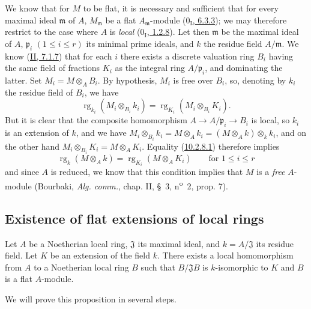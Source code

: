 We know that for $M$ to be flat, it is necessary and sufficient that for every
maximal ideal $\mathfrak m$ of $A$, $M_{\mathfrak m}$ be a flat
$A_{\mathfrak m}$-module
(\hyperref[0.6.3.3]{$0_{\mathrm I}$, 6.3.3}); we may therefore restrict to the case
where $A$ is \emph{local} (\hyperref[0.1.2.8]{$0_{\mathrm I}$, 1.2.8}).
Let then $\mathfrak m$ be the maximal ideal of $A$, $\mathfrak p_i$
$(1\leq i\leq r)$ its minimal prime ideals, and $k$ the residue field
$A/\mathfrak m$. We know (\hyperref[II.7.1.7]{II, 7.1.7}) that for each
$i$ there exists a discrete valuation ring $B_i$ having the same field of
fractions $K_i$ as the integral ring $A/\mathfrak p_i$, and dominating the
latter. Set $M_i=M\otimes_A B_i$. By hypothesis, $M_i$ is free over
$B_i$, so, denoting by $k_i$ the residue field of $B_i$, we have
\[
\label{0.10.2.8.1}
  \operatorname{rg}_{k_i}(M_i\otimes_{B_i}k_i)
  =\operatorname{rg}_{K_i}(M_i\otimes_{B_i}K_i).
  \tag{10.2.8.1}
\]
But it is clear that the composite homomorphism
$A\to A/\mathfrak p_i\to B_i$ is local, so $k_i$ is an extension of $k$,
and we have
$M_i\otimes_{B_i}k_i=M\otimes_A k_i=(M\otimes_A k)\otimes_k k_i$, and on
the other hand $M_i\otimes_{B_i}K_i=M\otimes_A K_i$. Equality
(\hyperref[0.10.2.8.1]{10.2.8.1}) therefore implies
\[
  \operatorname{rg}_k(M\otimes_A k)=\operatorname{rg}_{K_i}(M\otimes_A K_i)
  \qquad\text{for }1\leq i\leq r
\]
and since $A$ is reduced, we know that this condition implies that $M$ is a
\emph{free} $A$-module (Bourbaki, \emph{Alg. comm.}, chap. II, \S~3,
n\textsuperscript{o}~2, prop. 7).

\subsection{Existence of flat extensions of local rings}
\label{subsection:0.10.3}

\begin{proposition}[10.3.1]
\label{0.10.3.1}
Let $A$ be a Noetherian local ring, $\mathfrak J$ its maximal ideal, and
$k=A/\mathfrak J$ its residue field. Let $K$ be an extension of the field $k$. There
exists a local homomorphism from $A$ to a Noetherian local ring $B$ such
that $B/\mathfrak J B$ is $k$-isomorphic to $K$ and $B$ is a flat
$A$-module.
\end{proposition}

We will prove this proposition in several steps.

